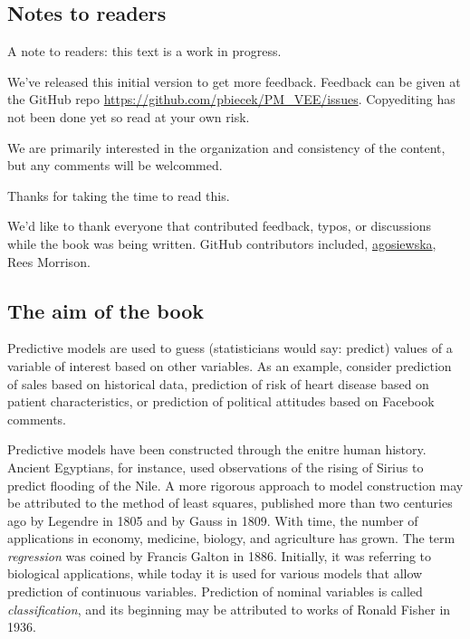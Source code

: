 \documentclass[12pt,]{krantz}
\theoremstyle{definition}
\theoremstyle{definition}
\theoremstyle{definition}
\theoremstyle{remark}
\begin{document}
\hypertarget{notes-to-readers}{%
\subsection{Notes to readers}\label{notes-to-readers}}

A note to readers: this text is a work in progress.

We've released this initial version to get more feedback. Feedback can
be given at the GitHub repo
\url{https://github.com/pbiecek/PM_VEE/issues}. Copyediting has not been
done yet so read at your own risk.

We are primarily interested in the organization and consistency of the
content, but any comments will be welcommed.

Thanks for taking the time to read this.

We'd like to thank everyone that contributed feedback, typos, or
discussions while the book was being written. GitHub contributors
included, \href{https://github.com/agosiewska/}{agosiewska}, Rees
Morrison.

\hypertarget{the-aim-of-the-book}{%
\subsection{The aim of the book}\label{the-aim-of-the-book}}

Predictive models are used to guess (statisticians would say: predict)
values of a variable of interest based on other variables. As an
example, consider prediction of sales based on historical data,
prediction of risk of heart disease based on patient characteristics, or
prediction of political attitudes based on Facebook comments.

Predictive models have been constructed through the enitre human
history. Ancient Egyptians, for instance, used observations of the
rising of Sirius to predict flooding of the Nile. A more rigorous
approach to model construction may be attributed to the method of least
squares, published more than two centuries ago by Legendre in 1805 and
by Gauss in 1809. With time, the number of applications in economy,
medicine, biology, and agriculture has grown. The term \emph{regression}
was coined by Francis Galton in 1886. Initially, it was referring to
biological applications, while today it is used for various models that
allow prediction of continuous variables. Prediction of nominal
variables is called \emph{classification}, and its beginning may be
attributed to works of Ronald Fisher in 1936.
\end{document}
